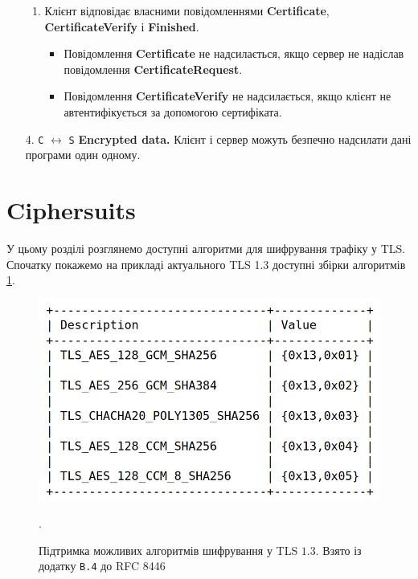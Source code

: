 \begin{enumerate}
\begin{enumerate}
        \item Клієнт відповідає власними повідомленнями \textbf{Certificate}, \textbf{CertificateVerify} і \textbf{Finished}. 
        
        \begin{itemize}
            \item Повідомлення \textbf{Certificate} не надсилається, якщо сервер не надіслав повідомлення \textbf{CertificateRequest}.
            \item Повідомлення \textbf{CertificateVerify} не надсилається, якщо клієнт не автентифікується за допомогою сертифіката.
        \end{itemize}
    \end{enumerate}
    
    \item[4. \texttt{С} $\longleftrightarrow$ \texttt{S}] \textbf{Encrypted data.} Клієнт і сервер можуть безпечно надсилати дані програми один одному.
   
\end{enumerate}

\section{Ciphersuits}

У цьому розділі розглянемо доступні алгоритми для шифрування трафіку у TLS. Спочатку покажемо на прикладі актуального TLS 1.3 доступні збірки алгоритмів \ref{tls_1_3_ciphersuits}.

\begin{figure}[ht]
        \centering
        \includegraphics[scale=0.35]{../IMAGES/ciphersuits.png}
        \caption{Підтримка можливих алгоритмів шифрування у TLS $1.3$. Взято із додатку \texttt{B.4} до RFC 8446}.
        \label{tls_1_3_ciphersuits}
\end{figure}

